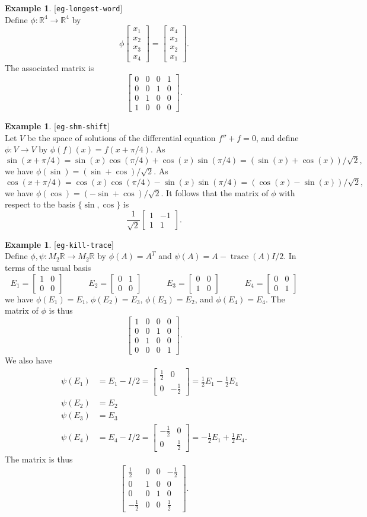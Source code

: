 \documentclass{amsart}
\newcommand{\lbl}[1]{\label{#1}\textup{[\texttt{#1}]}\ \\}
\newcommand{\lbl}{\label}
\newcommand{\R}         {{\mathbb{R}}}
\newcommand{\trc}       {\operatorname{trace}}
\newcommand{\bbm}       {\left[\begin{matrix}}
\newcommand{\ebm}       {\end{matrix}\right]}
\newcommand{\bsm}       {\left[\begin{smallmatrix}}
\newcommand{\esm}       {\end{smallmatrix}\right]}
\newcommand{\xra}       {\xrightarrow}
\newcommand{\half}      {{\textstyle\frac{1}{2}}}
\renewcommand{\:}       {\colon}
\theoremstyle{definition}
\newtheorem{example}[theorem]{Example}
\begin{document}
\begin{example}\lbl{eg-longest-word}
 Define $\phi\:\R^4\xra{}\R^4$ by 
 \[ \phi\bsm x_1\\ x_2\\ x_3\\ x_4\esm =
        \bsm x_4\\ x_3\\ x_2\\ x_1\esm.
 \]
 The associated matrix is
 \[ \bsm 0&0&0&1 \\ 0&0&1&0 \\ 0&1&0&0 \\ 1&0&0&0 \esm. \]
\end{example}

\begin{example}\lbl{eg-shm-shift}
 Let $V$ be the space of solutions of the differential equation
 $f''+f=0$, and define $\phi\:V\xra{}V$ by $\phi(f)(x)=f(x+\pi/4)$.
 As 
 \[ \sin(x+\pi/4) = \sin(x)\cos(\pi/4) + \cos(x)\sin(\pi/4) = 
     (\sin(x) + \cos(x))/\sqrt{2},
 \]
 we have $\phi(\sin)=(\sin+\cos)/\sqrt{2}$.  As
 \[ \cos(x+\pi/4) = \cos(x)\cos(\pi/4) - \sin(x)\sin(\pi/4) = 
     (\cos(x) - \sin(x))/\sqrt{2},
 \]
 we have $\phi(\cos)=(-\sin+\cos)/\sqrt{2}$.  It follows that the
 matrix of $\phi$ with respect to the basis $\{\sin,\cos\}$ is 
 \[ \frac{1}{\sqrt{2}} \bbm 1 & -1 \\ 1 & 1 \ebm. \]
\end{example}

\begin{example}\lbl{eg-kill-trace}
  Define $\phi,\psi\:M_2\R\xra{}M_2\R$ by $\phi(A)=A^T$ and
  $\psi(A)=A-\trc(A)I/2$.  In terms of the usual basis
  \[ E_1=\bsm 1&0\\0&0 \esm \hspace{3em}
     E_2=\bsm 0&1\\0&0 \esm \hspace{3em}
     E_3=\bsm 0&0\\1&0 \esm \hspace{3em}
     E_4=\bsm 0&0\\0&1 \esm
  \]
  we have $\phi(E_1)=E_1$, $\phi(E_2)=E_3$, $\phi(E_3)=E_2$, and
  $\phi(E_4)=E_4$.  The matrix of $\phi$ is thus
  \[ \bsm 1&0&0&0 \\ 0&0&1&0 \\ 0&1&0&0 \\ 0&0&0&1 \esm. \]
  We also have
  \begin{align*}
    \psi(E_1) &= E_1 - I/2 =
                 \bsm\half&0\\0&-\half\esm =
                 \half E_1 - \half E_4 \\
    \psi(E_2) &= E_2 \\
    \psi(E_3) &= E_3 \\
    \psi(E_4) &= E_4 - I/2 =
                 \bsm -\half&0\\0&\half\esm =
                 -\half E_1 + \half E_4.
  \end{align*}
  The matrix is thus
  \[ \bsm \half&0&0&-\half \\
          0&1&0&0 \\
          0&0&1&0 \\
          -\half&0&0&\half \esm.
  \]
\end{example}
\end{document}
